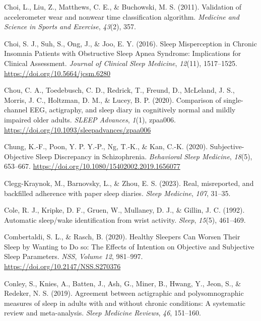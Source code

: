\documentclass[
]{article}
\newlength{\cslhangindent}
\newenvironment{CSLReferences}[2] %
 {\begin{list}{}{%
  \setlength{\itemindent}{0pt}
  \setlength{\leftmargin}{0pt}
  \setlength{\parsep}{0pt}
  \ifodd #1
   \setlength{\leftmargin}{\cslhangindent}
   \setlength{\itemindent}{-1\cslhangindent}
  \fi
  \setlength{\itemsep}{#2\baselineskip}}}
 {\end{list}}
\begin{document}
\begin{CSLReferences}{1}{0}
Choi, L., Liu, Z., Matthews, C. E., \& Buchowski, M. S. (2011). Validation of accelerometer wear and nonwear time classification algorithm. \emph{Medicine and Science in Sports and Exercise}, \emph{43}(2), 357.

Choi, S. J., Suh, S., Ong, J., \& Joo, E. Y. (2016). Sleep {Misperception} in {Chronic} {Insomnia} {Patients} with {Obstructive} {Sleep} {Apnea} {Syndrome}: {Implications} for {Clinical} {Assessment}. \emph{Journal of Clinical Sleep Medicine}, \emph{12}(11), 1517--1525. \url{https://doi.org/10.5664/jcsm.6280}

Chou, C. A., Toedebusch, C. D., Redrick, T., Freund, D., McLeland, J. S., Morris, J. C., Holtzman, D. M., \& Lucey, B. P. (2020). Comparison of single-channel {EEG}, actigraphy, and sleep diary in cognitively normal and mildly impaired older adults. \emph{SLEEP Advances}, \emph{1}(1), zpaa006. \url{https://doi.org/10.1093/sleepadvances/zpaa006}

Chung, K.-F., Poon, Y. P. Y.-P., Ng, T.-K., \& Kan, C.-K. (2020). Subjective-{Objective} {Sleep} {Discrepancy} in {Schizophrenia}. \emph{Behavioral Sleep Medicine}, \emph{18}(5), 653--667. \url{https://doi.org/10.1080/15402002.2019.1656077}

Clegg-Kraynok, M., Barnovsky, L., \& Zhou, E. S. (2023). Real, misreported, and backfilled adherence with paper sleep diaries. \emph{Sleep Medicine}, \emph{107}, 31--35.

Cole, R. J., Kripke, D. F., Gruen, W., Mullaney, D. J., \& Gillin, J. C. (1992). Automatic sleep/wake identification from wrist activity. \emph{Sleep}, \emph{15}(5), 461--469.

Combertaldi, S. L., \& Rasch, B. (2020). Healthy {Sleepers} {Can} {Worsen} {Their} {Sleep} by {Wanting} to {Do} so: {The} {Effects} of {Intention} on {Objective} and {Subjective} {Sleep} {Parameters}. \emph{NSS}, \emph{Volume 12}, 981--997. \url{https://doi.org/10.2147/NSS.S270376}

Conley, S., Knies, A., Batten, J., Ash, G., Miner, B., Hwang, Y., Jeon, S., \& Redeker, N. S. (2019). Agreement between actigraphic and polysomnographic measures of sleep in adults with and without chronic conditions: A systematic review and meta-analysis. \emph{Sleep Medicine Reviews}, \emph{46}, 151--160.


\end{CSLReferences}
\end{document}
